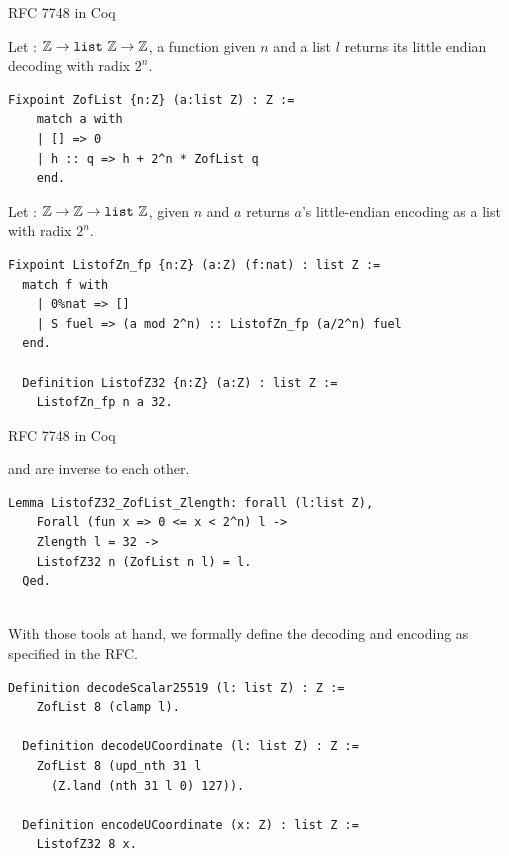\documentclass[8pt,aspectratio=169]{beamer}
\begin{document}
%
%
\begin{frame}[fragile]{RFC 7748 in Coq}
  \begin{informaltheorem}
  Let  : $\mathbb{Z} \rightarrow \texttt{list}~\mathbb{Z} \rightarrow \mathbb{Z}$,
  a function given $n$ and a list $l$ returns its little endian decoding with radix $2^n$.
\end{informaltheorem}
  \begin{lstlisting}[language=Coq]
  Fixpoint ZofList {n:Z} (a:list Z) : Z :=
    match a with
    | [] => 0
    | h :: q => h + 2^n * ZofList q
    end.
  \end{lstlisting}

  \begin{informaltheorem}
  Let  : $\mathbb{Z} \rightarrow \mathbb{Z} \rightarrow \texttt{list}~\mathbb{Z}$, given
  $n$ and $a$ returns $a$'s little-endian encoding as a list with radix $2^n$.
\end{informaltheorem}
  \begin{lstlisting}[language=Coq]
  Fixpoint ListofZn_fp {n:Z} (a:Z) (f:nat) : list Z :=
  match f with
    | 0%nat => []
    | S fuel => (a mod 2^n) :: ListofZn_fp (a/2^n) fuel
  end.

  Definition ListofZ32 {n:Z} (a:Z) : list Z :=
    ListofZn_fp n a 32.
  \end{lstlisting}
\end{frame}


%
%
\begin{frame}[fragile]{RFC 7748 in Coq}

   and  are inverse to each other.
  \begin{lstlisting}[language=Coq]
  Lemma ListofZ32_ZofList_Zlength: forall (l:list Z),
    Forall (fun x => 0 <= x < 2^n) l ->
    Zlength l = 32 ->
    ListofZ32 n (ZofList n l) = l.
  Qed.
  \end{lstlisting}

  ~\\

  With those tools at hand, we formally define the decoding and
  encoding as specified in the RFC.

  \begin{lstlisting}[language=Coq]
  Definition decodeScalar25519 (l: list Z) : Z :=
    ZofList 8 (clamp l).

  Definition decodeUCoordinate (l: list Z) : Z :=
    ZofList 8 (upd_nth 31 l
      (Z.land (nth 31 l 0) 127)).

  Definition encodeUCoordinate (x: Z) : list Z :=
    ListofZ32 8 x.
  \end{lstlisting}

\end{frame}
\end{document}

